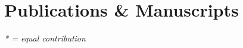 \documentclass[a4paper,11pt]{article}
\makeatletter
\newcommand{\resumeProject}[4]{
\vspace{0.5mm}\item
    \begin{tabular*}{0.98\textwidth}[t]{l@{\extracolsep{\fill}}r}
        \textbf{#1} & \textit{\footnotesize{#3}} \\
        \footnotesize{\textit{#2}} & \footnotesize{#4}
    \end{tabular*}
    \vspace{-2.4mm}
}
\newcommand{\resumeItemListStart}{\begin{itemize}[leftmargin=*,labelsep=1mm,itemsep=0.5mm]}
\newcommand{\resumeSubHeadingListEnd}{\end{itemize}\vspace{2mm}}
\newcommand{\resumeItemListEnd}{\end{itemize}\vspace{-2mm}}
\makeatother
\begin{document}



\section{\textbf{Publications \& Manuscripts}}
\vspace{0.5mm}
\small{\textit{* = equal contribution}}
\vspace{1mm}
\end{document}
